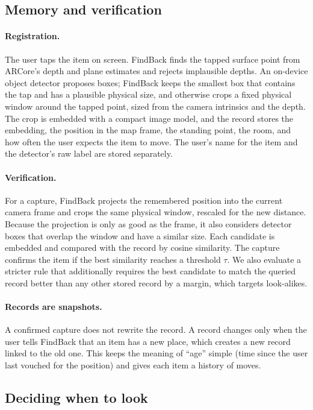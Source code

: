 \documentclass[sigconf,10pt]{acmart}
\newcommand{\sys}{FindBack}
\begin{document}
\subsection{Memory and verification}

\paragraph{Registration.}
The user taps the item on screen.
\sys{} finds the tapped surface point from ARCore's depth and plane estimates and rejects
implausible depths.
An on-device object detector proposes boxes; \sys{} keeps the smallest box that contains the tap
and has a plausible physical size, and otherwise crops a fixed physical window around the tapped
point, sized from the camera intrinsics and the depth.
The crop is embedded with a compact image model, and the record stores the embedding, the position
in the map frame, the standing point, the room, and how often the user expects the item to move.
The user's name for the item and the detector's raw label are stored separately.

\paragraph{Verification.}
For a capture, \sys{} projects the remembered position into the current camera frame and crops
the same physical window, rescaled for the new distance.
Because the projection is only as good as the frame, it also considers detector boxes that
overlap the window and have a similar size.
Each candidate is embedded and compared with the record by cosine similarity.
The capture confirms the item if the best similarity reaches a threshold $\tau$.
We also evaluate a stricter rule that additionally requires the best candidate to match the
queried record better than any other stored record by a margin, which targets look-alikes.

\paragraph{Records are snapshots.}
A confirmed capture does not rewrite the record.
A record changes only when the user tells \sys{} that an item has a new place, which creates a
new record linked to the old one.
This keeps the meaning of ``age'' simple (time since the user last vouched for the position) and
gives each item a history of moves.

\subsection{Deciding when to look}
\end{document}
